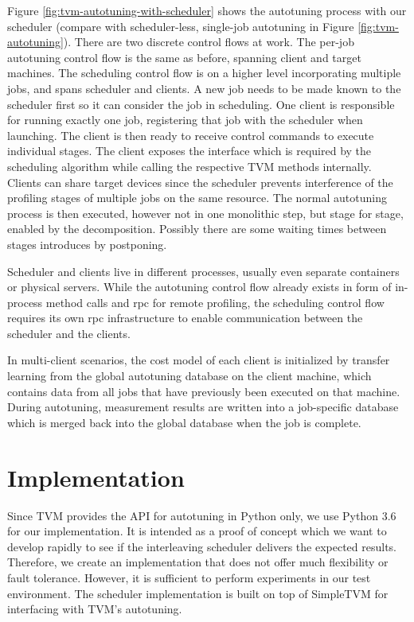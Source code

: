 Figure \ref{fig:tvm-autotuning-with-scheduler} shows the autotuning process with our scheduler (compare with scheduler-less, single-job autotuning in Figure \ref{fig:tvm-autotuning}). There are two discrete control flows at work. The per-job autotuning control flow is the same as before, spanning client and target machines. The scheduling control flow is on a higher level incorporating multiple jobs, and spans scheduler and clients. A new job needs to be made known to the scheduler first so it can consider the job in scheduling. One client is responsible for running exactly one job, registering that job with the scheduler when launching. The client is then ready to receive control commands to execute individual stages. The client exposes the interface which is required by the scheduling algorithm while calling the respective TVM methods internally. Clients can share target devices since the scheduler prevents interference of the profiling stages of multiple jobs on the same resource. The normal autotuning process is then executed, however not in one monolithic step, but stage for stage, enabled by the decomposition. Possibly there are some waiting times between stages introduces by postponing.

Scheduler and clients live in different processes, usually even separate containers or physical servers. While the autotuning control flow already exists in form of in-process method calls and \gls{rpc} for remote profiling, the scheduling control flow requires its own \gls{rpc} infrastructure to enable communication between the scheduler and the clients.

In multi-client scenarios, the cost model of each client is initialized by transfer learning from the global autotuning database on the client machine, which contains data from all jobs that have previously been executed on that machine. During autotuning, measurement results are written into a job-specific database which is merged back into the global database when the job is complete.

\section{Implementation}
Since TVM provides the API for autotuning in Python only, we use Python 3.6 for our implementation. It is intended as a proof of concept which we want to develop rapidly to see if the interleaving scheduler delivers the expected results. Therefore, we create an implementation that does not offer much flexibility or fault tolerance. However, it is sufficient to perform experiments in our test environment. The scheduler implementation is built on top of SimpleTVM for interfacing with TVM's autotuning.

